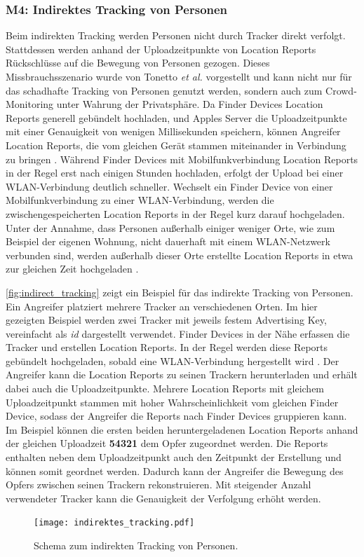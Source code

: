 \subsubsection[M4]{M4: Indirektes Tracking von Personen}
\label{missbrauch:4}
Beim indirekten Tracking werden Personen nicht durch Tracker direkt verfolgt.
Stattdessen werden anhand der Uploadzeitpunkte von Location Reports Rückschlüsse auf die Bewegung von Personen gezogen.
Dieses Missbrauchsszenario wurde von Tonetto \textit{et al.} \cite{Tonetto_FindMy} vorgestellt und kann nicht nur für das schadhafte Tracking von Personen genutzt werden, sondern auch zum Crowd-Monitoring unter Wahrung der Privatsphäre.
Da Finder Devices Location Reports generell gebündelt hochladen, und Apples Server die Uploadzeitpunkte mit einer Genauigkeit von wenigen Millisekunden speichern, können Angreifer Location Reports, die vom gleichen Gerät stammen miteinander in Verbindung zu bringen \cite{Tonetto_FindMy}.
Während Finder Devices mit Mobilfunkverbindung Location Reports in der Regel erst nach einigen Stunden hochladen, erfolgt der Upload bei einer WLAN-Verbindung deutlich schneller.
Wechselt ein Finder Device von einer Mobilfunkverbindung zu einer WLAN-Verbindung, werden die zwischengespeicherten Location Reports in der Regel kurz darauf hochgeladen.
Unter der Annahme, dass Personen außerhalb einiger weniger Orte, wie zum Beispiel der eigenen Wohnung, nicht dauerhaft mit einem WLAN-Netzwerk verbunden sind, werden außerhalb dieser Orte erstellte Location Reports in etwa zur gleichen Zeit hochgeladen \cite{Tonetto_FindMy}.

\autoref{fig:indirect_tracking} zeigt ein Beispiel für das indirekte Tracking von Personen.
Ein Angreifer platziert mehrere Tracker an verschiedenen Orten.
Im hier gezeigten Beispiel werden zwei Tracker mit jeweils festem Advertising Key, vereinfacht als \textit{id} dargestellt verwendet.
Finder Devices in der Nähe erfassen die Tracker und erstellen Location Reports.
In der Regel werden diese Reports gebündelt hochgeladen, sobald eine WLAN-Verbindung hergestellt wird \cite{Tonetto_FindMy}.
Der Angreifer kann die Location Reports zu seinen Trackern herunterladen und erhält dabei auch die Uploadzeitpunkte.
Mehrere Location Reports mit gleichem Uploadzeitpunkt stammen mit hoher Wahrscheinlichkeit vom gleichen Finder Device, sodass der Angreifer die Reports nach Finder Devices gruppieren kann.
Im Beispiel können die ersten beiden heruntergeladenen Location Reports anhand der gleichen Uploadzeit \textbf{54321} dem Opfer zugeordnet werden.
Die Reports enthalten neben dem Uploadzeitpunkt auch den Zeitpunkt der Erstellung und können somit geordnet werden.
Dadurch kann der Angreifer die Bewegung des Opfers zwischen seinen Trackern rekonstruieren.
Mit steigender Anzahl verwendeter Tracker kann die Genauigkeit der Verfolgung erhöht werden.
\begin{figure}[ht]
  \centering
  \texttt{[image: indirektes\_tracking.pdf]}
  \caption{Schema zum indirekten Tracking von Personen.}
  \label{fig:indirect_tracking}
\end{figure}

